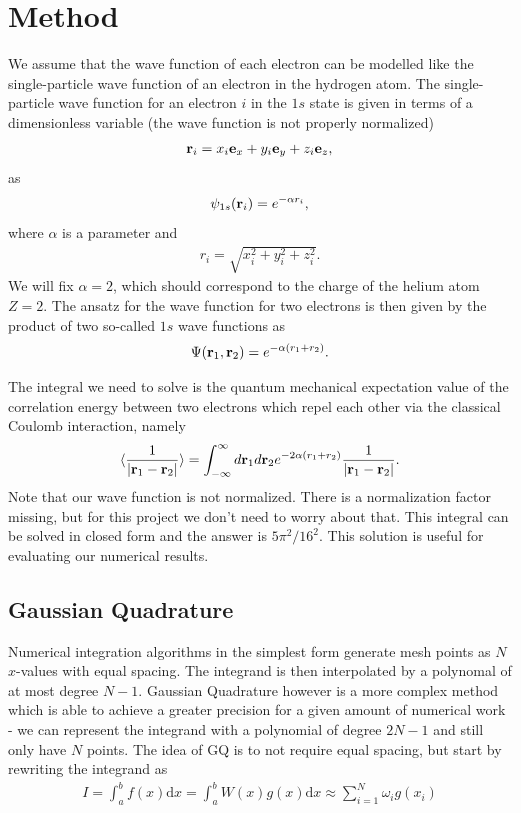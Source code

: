\documentclass[norsk,a4paper,11pt]{article}
\begin{document}
\section{Method}
We assume that the wave function of each electron can be modelled like the single-particle
wave function of an electron in the hydrogen atom. The single-particle wave function for an electron $i$ in the
$1s$ state
is given in terms of a dimensionless variable (the wave function is not properly normalized)
\begin{align}
    {\bf r}_i = x_i {\bf e}_x + y_i {\bf e}_y +z_i {\bf e}_z ,
\end{align}
as
\begin{align}
\psi_{1s}({\bf r}_i) = e^{-\alpha r_i},
\end{align}
where $\alpha$ is a parameter and
\begin{align}
r_i = \sqrt{x_i^2+y_i^2+z_i^2}.
\end{align}
We will fix $\alpha=2$, which should correspond to the charge of the helium atom $Z=2$.
The ansatz for the wave function for two electrons is then given by the product of two
so-called
$1s$ wave functions as
\begin{align}
\Psi({\bf r}_1,{\bf r}_2) = e^{-\alpha (r_1+r_2)}.
\end{align}

The integral we need to solve is the quantum mechanical expectation value of the correlation
energy between two electrons which repel each other via the classical Coulomb interaction, namely
\begin{equation}\label{eq:correlationenergy}
\langle \frac{1}{|{\bf r}_1-{\bf r}_2|} \rangle =
\int_{-\infty}^{\infty} d{\bf r}_1d{\bf r}_2 e^{-2\alpha (r_1+r_2)}\frac{1}{|{\bf r}_1-{\bf r}_2|}.
\end{equation}
Note that our wave function is not normalized. There is a normalization factor missing, but for this project
we don't need to worry about that.
This integral can be solved in closed form and the answer is $5\pi^2/16^2$. This solution is useful for evaluating our
numerical results.
\subsection{Gaussian Quadrature}
Numerical integration algorithms in the simplest form generate mesh points as 
$N$ $x$-values with equal spacing. The integrand is then interpolated by a polynomal of at most
degree $N - 1$. Gaussian Quadrature however is a more complex method which is able to achieve a greater precision
for a given amount of numerical work - we can represent the integrand with a polynomial of degree $2N-1$ and still only
have $N$ points. The idea of GQ is to not require
equal spacing, but start by rewriting the integrand as
\begin{align}
    I = \int_a^b f(x) \mathrm{d}x = \int_a^b W(x) g(x) \mathrm{d}x \approx \sum_{i=1}^{N} \omega_i g(x_i)
\end{align} 
\end{document}
